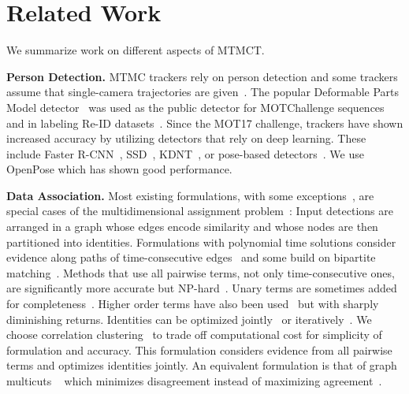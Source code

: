 \documentclass[10pt,twocolumn,letterpaper]{article}
\begin{document}
\section{Related Work}

We summarize work on different aspects of MTMCT.

\noindent\textbf{Person Detection.} MTMC trackers rely on person detection and some trackers assume that single-camera trajectories are given~\cite{bredereck_data_2012,cai_exploring_2014,chen_adaptive_2011,chen_multitarget_2015,chen_direction-based_2011,daliyot_framework_2013,das2014consistent,gilbert_tracking_2006,javed_modeling_2008,kuo_intercamera_2010,makris_bridging_2004,zhang_camera_2015}. The popular Deformable Parts Model detector~\cite{felzenszwalb2010object} was used as the public detector for MOTChallenge sequences~\cite{MOTChallenge2015, milan2016mot16, ristani2016performance} and in labeling Re-ID datasets~\cite{zheng2016mars, zheng2015scalable}. Since the MOT17 challenge, trackers have shown increased accuracy by utilizing detectors that rely on deep learning. These include Faster R-CNN~\cite{ren2015faster}, SSD~\cite{liu2016ssd}, KDNT~\cite{yu2016poi}, or pose-based detectors~\cite{cao2017realtime, insafutdinov2016deepercut}. We use OpenPose \cite{cao2017realtime} which has shown good performance.


\noindent\textbf{Data Association.}
Most existing formulations, with some exceptions~\cite{beyer2017towards, Milan:2017:AAAI_RNNTracking,  Milan:2014:CEM}, are special cases of the multidimensional assignment problem~\cite{collins2012multitarget}: Input detections are arranged in a graph whose edges encode similarity and whose nodes are then partitioned into identities. Formulations with polynomial time solutions consider evidence along paths of time-consecutive edges~\cite{BerclazFTF11, CaoCCZH15, Fleuret08a,Izadinia_ECCV12_MP2T,javed_modeling_2008,jiuqing_distributed_2013, pirsiavash2011globally,zhang2008global,zhang_tracking_2015} and some build on bipartite matching~\cite{brendel2011multiobject, cai_exploring_2014,chen_multitarget_2015,daliyot_framework_2013, kuo_intercamera_2010, shu2012part,wu2007detection}. Methods that use all pairwise terms, not only time-consecutive ones, are significantly more accurate but NP-hard~\cite{chari2015pairwise,collins2012multitarget,das2014consistent, dehghan2015gmmcp,kumar2014multiple,ristani2014tracking, shafique2005noniterative,tang2015subgraph,tang2016multi,tang2017multiple}. Unary terms are sometimes added for completeness~\cite{dehghan2015gmmcp, tang2015subgraph}. Higher order terms have also been used~\cite{butt2013multiple, wen2014multiple} but with sharply diminishing returns.  Identities can be optimized jointly~\cite{dehghan2015gmmcp} or iteratively~\cite{ZamirECCV12}. We choose correlation clustering~\cite{bansal2002correlation, ristani2016performance, ristani2014tracking} to trade off computational cost for simplicity of formulation and accuracy. This formulation considers evidence from all pairwise terms and optimizes identities jointly. An equivalent formulation is that of graph multicuts ~\cite{tang2016multi} which minimizes disagreement instead of maximizing agreement~\cite{demaine2006correlation}.
\end{document}
